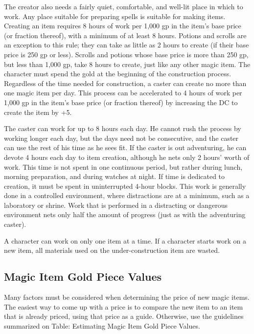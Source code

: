 The creator also needs a fairly quiet, comfortable, and well-lit place in which to work. Any place suitable for preparing spells is suitable for making items. Creating an item requires 8 hours of work per 1,000 gp in the item's base price (or fraction thereof), with a minimum of at least 8 hours. Potions and scrolls are an exception to this rule; they can take as little as 2 hours to create (if their base price is 250 gp or less). Scrolls and potions whose base price is more than 250 gp, but less than 1,000 gp, take 8 hours to create, just like any other magic item. The character must spend the gold at the beginning of the construction process. Regardless of the time needed for construction, a caster can create no more than one magic item per day. This process can be accelerated to 4 hours of work per 1,000 gp in the item's base price (or fraction thereof) by increasing the DC to create the item by +5.
				
The caster can work for up to 8 hours each day. He cannot rush the process by working longer each day, but the days need not be consecutive, and the caster can use the rest of his time as he sees fit. If the caster is out adventuring, he can devote 4 hours each day to item creation, although he nets only 2 hours' worth of work. This time is not spent in one continuous period, but rather during lunch, morning preparation, and during watches at night. If time is dedicated to creation, it must be spent in uninterrupted 4-hour blocks. This work is generally done in a controlled environment, where distractions are at a minimum, such as a laboratory or shrine. Work that is performed in a distracting or dangerous environment nets only half the amount of progress (just as with the adventuring caster).
				
A character can work on only one item at a time. If a character starts work on a new item, all materials used on the under-construction item are wasted.
				
\subsection{Magic Item Gold Piece Values}

				
Many factors must be considered when determining the price of new magic items. The easiest way to come up with a price is to compare the new item to an item that is already priced, using that price as a guide. Otherwise, use the guidelines summarized on Table: Estimating Magic Item Gold Piece Values.


